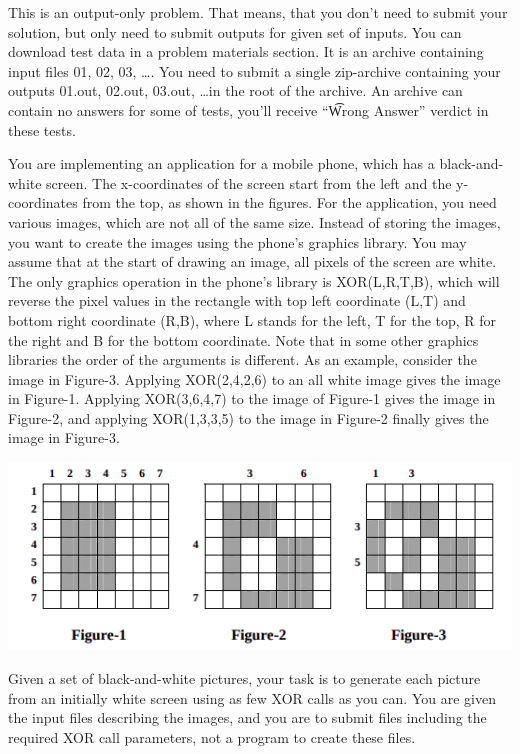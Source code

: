 This is an output-only problem. That means, that you don't need to submit your solution, but only need to submit outputs for given set of inputs. You can download test data in a problem materials section. It is an archive containing input files 01, 02, 03, \dots. You need to submit a single zip-archive containing your outputs 01.out, 02.out, 03.out, \dots in the root of the archive.  An archive can contain no answers for some of tests, you'll receive ``\t{Wrong Answer}'' verdict in these tests.

You are implementing an application for a mobile phone, which has a black-and-white
screen. The x-coordinates of the screen start from the left and the y-coordinates from the
top, as shown in the figures. For the application, you need various images, which are
not all of the same size. Instead of storing the images, you want to create the images
using the phone's graphics library. You may assume that at the start of drawing an
image, all pixels of the screen are white. The only graphics operation in the phone's
library is XOR(L,R,T,B), which will reverse the pixel values in the rectangle with
top left coordinate (L,T) and bottom right coordinate (R,B), where L stands for the left,
T for the top, R for the right and B for the bottom coordinate. Note that in some other
graphics libraries the order of the arguments is different.
As an example, consider the image in Figure-3. Applying XOR(2,4,2,6) to an all
white image gives the image in Figure-1. Applying XOR(3,6,4,7) to the image of
Figure-1 gives the image in Figure-2, and applying XOR(1,3,3,5) to the image in
Figure-2 finally gives the image in Figure-3.

\begin{center}
\includegraphics{1.png}
\end{center}

Given a set of black-and-white pictures, your task is to generate each picture from an
initially white screen using as few XOR calls as you can. You are given the input files
describing the images, and you are to submit files including the required XOR call
parameters, not a program to create these files.